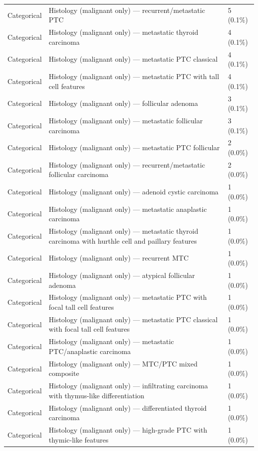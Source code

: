 \begin{table}[htbp]
\begin{tabular}{lll}
Categorical & Histology (malignant only) — recurrent/metastatic PTC & 5 (0.1\%) \\
Categorical & Histology (malignant only) — metastatic thyroid carcinoma & 4 (0.1\%) \\
Categorical & Histology (malignant only) — metastatic PTC classical & 4 (0.1\%) \\
Categorical & Histology (malignant only) — metastatic PTC with tall cell features & 4 (0.1\%) \\
Categorical & Histology (malignant only) — follicular adenoma & 3 (0.1\%) \\
Categorical & Histology (malignant only) — metastatic follicular carcinoma & 3 (0.1\%) \\
Categorical & Histology (malignant only) — metastatic PTC follicular & 2 (0.0\%) \\
Categorical & Histology (malignant only) — recurrent/metastatic follicular carcinoma & 2 (0.0\%) \\
Categorical & Histology (malignant only) — adenoid cystic carcinoma & 1 (0.0\%) \\
Categorical & Histology (malignant only) — metastatic anaplastic carcinoma & 1 (0.0\%) \\
Categorical & Histology (malignant only) — metastatic thyroid carcinoma with hurthle cell and paillary features & 1 (0.0\%) \\
Categorical & Histology (malignant only) — recurrent MTC & 1 (0.0\%) \\
Categorical & Histology (malignant only) — atypical follicular adenoma & 1 (0.0\%) \\
Categorical & Histology (malignant only) — metastatic PTC with focal tall cell features & 1 (0.0\%) \\
Categorical & Histology (malignant only) — metastatic PTC classical with focal tall cell features & 1 (0.0\%) \\
Categorical & Histology (malignant only) — metastatic PTC/anaplastic carcinoma & 1 (0.0\%) \\
Categorical & Histology (malignant only) — MTC/PTC mixed composite & 1 (0.0\%) \\
Categorical & Histology (malignant only) — infiltrating carcinoma with thymus-like differentiation & 1 (0.0\%) \\
Categorical & Histology (malignant only) — differentiated thyroid carcinoma & 1 (0.0\%) \\
Categorical & Histology (malignant only) — high-grade PTC with thymic-like features & 1 (0.0\%) \\

\end{tabular}
\end{table}
